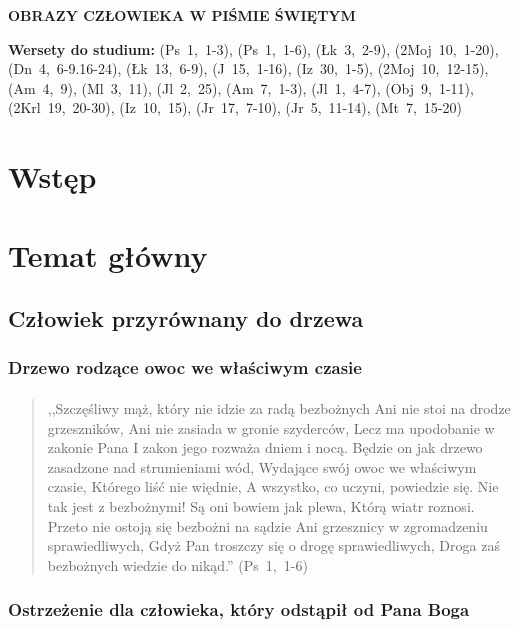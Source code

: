\documentclass[10pt,a4paper,oneside]{article}
\begin{document}
\centerline{\textbf{\MakeUppercase{Obrazy człowieka w Piśmie Świętym}}}
\begin{center}
\textbf{Wersety do studium:} \mbox{(Ps 1, 1-3)}, \mbox{(Ps 1, 1-6)}, \mbox{(Łk 3, 2-9)}, \mbox{(2Moj 10, 1-20)}, \mbox{(Dn 4, 6-9.16-24)}, \mbox{(Łk 13, 6-9)}, \mbox{(J 15, 1-16)}, \mbox{(Iz 30, 1-5)}, \mbox{(2Moj 10, 12-15)}, \mbox{(Am 4, 9)}, \mbox{(Ml 3, 11)}, \mbox{(Jl 2, 25)}, \mbox{(Am 7, 1-3)}, \mbox{(Jl 1, 4-7)}, \mbox{(Obj 9, 1-11)}, \mbox{(2Krl 19, 20-30)}, \mbox{(Iz 10, 15)}, \mbox{(Jr 17, 7-10)}, \mbox{(Jr 5, 11-14)}, \mbox{(Mt 7, 15-20)}
\end{center}
\section{Wstęp}
\section{Temat główny}
\subsection{Człowiek przyrównany do drzewa}
\subsubsection{Drzewo rodzące owoc we właściwym czasie}
\paragraph{}
\begin{quote}
,,Szczęśliwy mąż, który nie idzie za radą bezbożnych Ani nie stoi na drodze grzeszników, Ani nie zasiada w gronie szyderców, Lecz ma upodobanie w zakonie Pana I zakon jego rozważa dniem i nocą. Będzie on jak drzewo zasadzone nad strumieniami wód, Wydające swój owoc we właściwym czasie, Którego liść nie więdnie, A wszystko, co uczyni, powiedzie się. Nie tak jest z bezbożnymi! Są oni bowiem jak plewa, Którą wiatr roznosi. Przeto nie ostoją się bezbożni na sądzie Ani grzesznicy w zgromadzeniu sprawiedliwych, Gdyż Pan troszczy się o drogę sprawiedliwych, Droga zaś bezbożnych wiedzie do nikąd.'' \mbox{(Ps 1, 1-6)}
\end{quote}
\subsubsection{Ostrzeżenie dla człowieka, który odstąpił od Pana Boga}
\end{document}
